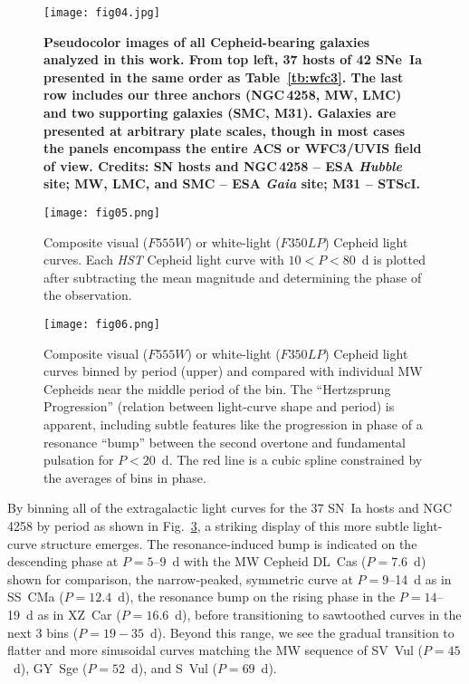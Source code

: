 \documentclass[12pt]{aastex631}
\begin{document}
\begin{figure}[hb]
\texttt{[image: fig04.jpg]}
\caption{\label{fg:hstcol} \bf Pseudocolor images of all Cepheid-bearing galaxies analyzed in this work. From top left, 37 hosts of 42 SNe~Ia presented in the same order as Table~\ref{tb:wfc3}. The last row includes our three anchors (NGC$\,$4258, MW, LMC) and two supporting galaxies (SMC, M31). Galaxies are presented at arbitrary plate scales, though in most cases the panels encompass the entire ACS or WFC3/UVIS field of view. Credits: SN hosts and NGC$\,$4258 -- ESA {\it Hubble} site; MW, LMC, and SMC -- ESA {\it Gaia} site; M31 -- STScI.} 
\end{figure}

\clearpage

\begin{figure}[t]
\begin{center}
\texttt{[image: fig05.png]}
\end{center}
\caption{\label{fg:cmplc} Composite visual ($F555W$) or white-light ($F350LP$) Cepheid light curves.  Each {\it HST} Cepheid light curve with $10 < P < 80$~d is plotted after subtracting the mean magnitude and determining the phase of the observation.  }
\end{figure}

\begin{figure}[b]
\begin{center}
\texttt{[image: fig06.png]}
\end{center}
\caption{\label{fg:hzprg} Composite visual ($F555W$) or white-light ($F350LP$) Cepheid light curves binned by period (upper) and compared with individual MW Cepheids near the middle period of the bin.  The ``Hertzsprung Progression'' (relation between light-curve shape and period) is apparent, including subtle features like the progression in phase of a resonance ``bump'' between the second overtone and fundamental pulsation for $P<20$~d.  The red line is a cubic spline constrained by the averages of bins in phase.}
\end{figure}
\clearpage
   
By binning all of the extragalactic light curves for the 37 SN~Ia hosts and NGC$\,$4258 by period as shown in Fig.~\ref{fg:hzprg}, a striking display of this more subtle light-curve structure emerges.  The resonance-induced bump is indicated on the descending phase at $P = 5$--9~d with the MW Cepheid DL~Cas ($P=7.6$~d) shown for comparison, the narrow-peaked, symmetric curve at $P=9$--14~d as in SS~CMa ($P=12.4$~d), the resonance bump on the rising phase in the $P=14$--19~d as in XZ~Car ($P=16.6$~d), before transitioning to sawtoothed curves in the next 3 bins ($P=19-35$~d). Beyond this range, we see the gradual transition to flatter and more sinusoidal curves matching the MW sequence of SV~Vul ($P=45$~d), GY~Sge ($P=52$~d), and S~Vul ($P=69$~d). 
\end{document}
